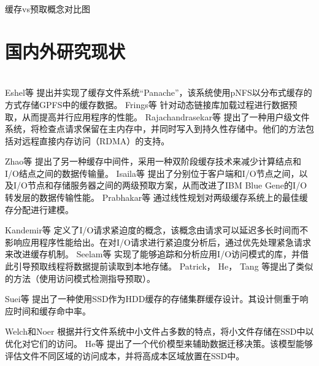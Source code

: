 {\color{red}缓存vs预取概念对比图}

\section{国内外研究现状}
\\



Eshel等\cite{Panache}
提出并实现了缓存文件系统“Panache”，该系统使用pNFS以分布式缓存的方式存储GPFS中的缓存数据。
Frings等\cite{Massively_Parallel_Loading}
针对动态链接库加载过程进行数据预取，从而提高并行应用程序的性能。
Rajachandrasekar等\cite{1PB}
提出了一种用户级文件系统，将检查点请求保留在主内存中，并同时写入到持久性存储中。他们的方法包括对远程直接内存访问（RDMA）的支持。

Zhao等\cite{HyCache+}
提出了另一种缓存中间件，采用一种双阶段缓存技术来减少计算结点和I/O结点之间的数据传输量。
Isaila等\cite{Multi_Leve_Data_Staging_for_Blue_Gene}
提出了分别位于客户端和I/O节点之间，以及I/O节点和存储服务器之间的两级预取方案，从而改进了IBM Blue Gene的I/O转发层的数据传输性能。
Prabhakar等\cite{Adaptive_Multi_level_Cache_Allocation_in_Distribute_Storage_Architectures}
通过线性规划对两级缓存系统上的最佳缓存分配进行建模。

Kandemir等\cite{On_Urgency_of_I/O_Operations}
定义了I/O请求紧迫度的概念，该概念由请求可以延迟多长时间而不影响应用程序性能给出。在对I/O请求进行紧迫度分析后，通过优先处理紧急请求来改进缓存机制。
Seelam等\cite{Masking_IO_latency_using_application_level_IO_caching_and_prefetching_on_Blue_Gene_systems}
实现了能够追踪和分析应用I/O访问模式的库，并借此引导预取线程将数据提前读取到本地存储。
Patrick\cite{Cashing_in_on_Hints_for_Better_Prefetching_and_Caching_in_PVFS_and_MPI_IO}，
He\cite{KNOWAC}，
Tang\cite{Improving_read_performance_with_online_access_pattern_analysis_and_prefetching}
等提出了类似的方法（使用访问模式检测指导预取）。


Suei等\cite{Endurance_Aware_Flash_Cache_Management_for_Storage_Servers}
提出了一种使用SSD作为HDD缓存的存储集群缓存设计。其设计侧重于响应时间和缓存命中率。 

Welch和Noer\cite{Optimizing_a_hybrid_SSD_HDD_HPC_storage_system_based_on_file_size_distributions}
根据并行文件系统中小文件占多数的特点，将小文件存储在SSD中以优化对它们的访问。
He等\cite{Proceedings_of_the_22nd_international_symposium_on_High_performance_parallel_and_distributed_computing}
提出了一个代价模型来辅助数据迁移决策。该模型能够评估文件不同区域的访问成本，并将高成本区域放置在SSD中。

